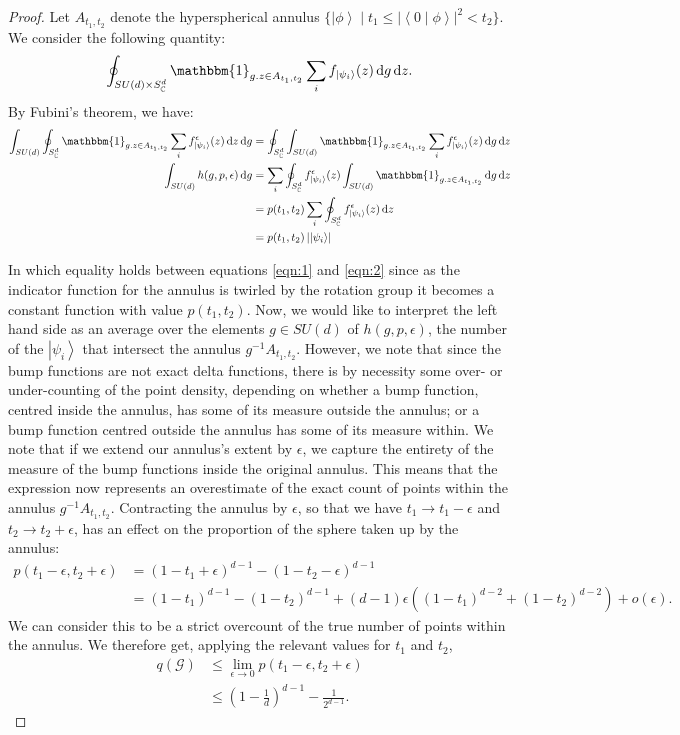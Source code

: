 \documentclass{amsart}
\theoremstyle{definition}
\newcommand{\ket}[1]{{\left\vert{#1}\right\rangle}}
\newcommand{\sprod}[2]{\left|\left< {#1} \middle| {#2} \right>\right|}
\newcommand*\dif{\mathop{}\!\mathrm{d}}
\begin{document}
\begin{proof}
Let $A_{t_1,t_2}$ denote the hyperspherical annulus $\{\ket{\phi}\mid t_1\leq\sprod{0}{\phi}^2< t_2\}$. We consider the following quantity:
\begin{equation}
\oint_{SU(d)\times S_\mathbb{C}^d} \mathbbm{1}_{g.z\in A_{t_1,t_2}} \sum_i f_\ket{\psi_i}(z) \dif g\dif z.
\end{equation}
By Fubini's theorem, we have:
\begin{align}
\int_{SU(d)} \oint_{S_\mathbb{C}^d} \mathbbm{1}_{g.z\in A_{t_1,t_2}} \sum_i f^\epsilon_\ket{\psi_i}(z) \dif z \dif g &= \oint_{S_\mathbb{C}^d} \int_{SU(d)}  \mathbbm{1}_{g.z\in A_{t_1,t_2}} \sum_i f^\epsilon_\ket{\psi_i}(z) \dif g \dif z \\
\int_{SU(d)} h(g,p,\epsilon) \dif g  &= \sum_i\oint_{S_\mathbb{C}^d}f^\epsilon_\ket{\psi_i}(z)  \int_{SU(d)} \mathbbm{1}_{g.z\in A_{t_1,t_2}} \dif g \dif z \label{eqn:1} \\
 &= p(t_1,t_2)\sum_i\oint_{S_\mathbb{C}^d}f^\epsilon_\ket{\psi_i}(z)  \dif z \label{eqn:2} \\
&= p(t_1,t_2)\left|\ket{\psi_i}\right|
\end{align}



In which equality holds between equations \ref{eqn:1} and \ref{eqn:2} since as the indicator function for the annulus is twirled by the rotation group it becomes a constant function with value $p(t_1,t_2)$. Now, we would like to interpret the left hand side as an average over the elements $g\in SU(d)$ of $h(g,p,\epsilon)$, the number of the $\ket{\psi_i}$ that intersect the annulus $g^{-1}A_{t_1,t_2}$. However, we note that since the bump functions are not exact delta functions, there is by necessity some over- or under-counting of the point density, depending on whether a bump function, centred inside the annulus, has some of its measure outside the annulus; or a bump function centred outside the annulus has some of its measure within. We note that if we extend our annulus's extent by $\epsilon$, we capture the entirety of the measure of the bump functions inside the original annulus. This means that the expression now represents an overestimate of the exact count of points within the annulus $g^{-1}A_{t_1,t_2}$. Contracting the annulus by $\epsilon$, so that we have $t_1\rightarrow t_1-\epsilon$ and $t_2\rightarrow t_2+\epsilon$,  has an effect on the proportion of the sphere taken up by the annulus:
\begin{align}
p(t_1-\epsilon,t_2+\epsilon)&=\left(1-t_1+\epsilon\right)^{d-1}-\left(1-t_2-\epsilon\right)^{d-1}\\
&=(1-t_1)^{d-1}-(1-t_2)^{d-1}+(d-1)\epsilon\left((1-t_1)^{d-2}+(1-t_2)^{d-2}\right)+o(\epsilon).
\end{align}
We can consider this to be a strict overcount of the true number of points within the annulus. We therefore get, applying the relevant values for $t_1$ and $t_2$,
\begin{align}
q(\mathcal{G})&\leq \lim_{\epsilon\rightarrow0}p(t_1-\epsilon,t_2+\epsilon) \\
&\leq \left(1-\frac1d\right)^{d-1}-\frac{1}{2^{d-1}}.
\end{align}

\end{proof} 
\end{document}
